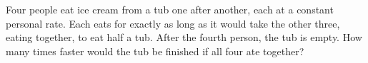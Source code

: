 Four people eat ice cream from a tub one after another, each at a constant personal rate. Each eats for exactly as long as it would take the other three, eating together, to eat half a tub. After the fourth person, the tub is empty. How many times faster would the tub be finished if all four ate together?
